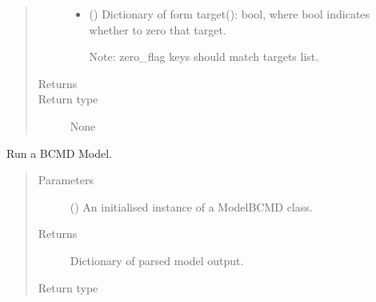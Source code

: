 \documentclass[letterpaper,10pt,english]{sphinxmanual}
\begin{document}
\begin{fulllineitems}
\begin{quote}
\begin{description}
\begin{itemize}
\item {} 
 () \textendash{} 
Dictionary of form target(): bool, where bool indicates
whether to zero that target.

Note: zero\_flag keys should match targets list.


\end{itemize}

\item[{Returns}] \leavevmode


\item[{Return type}] \leavevmode
None

\end{description}\end{quote}

\end{fulllineitems}


\begin{fulllineitems}
\label{\detokenize{misc:bayescmd.results_handling.run_model}}
Run a BCMD Model.
\begin{quote}\begin{description}
\item[{Parameters}] \leavevmode
{} ({\hyperref[\detokenize{bcmdModel:bayescmd.bcmdModel.ModelBCMD}]{}}) \textendash{} An initialised instance of a ModelBCMD class.

\item[{Returns}] \leavevmode
{} \textendash{} Dictionary of parsed model output.

\item[{Return type}] \leavevmode
{}

\end{description}\end{quote}

\end{fulllineitems}

\end{document}
